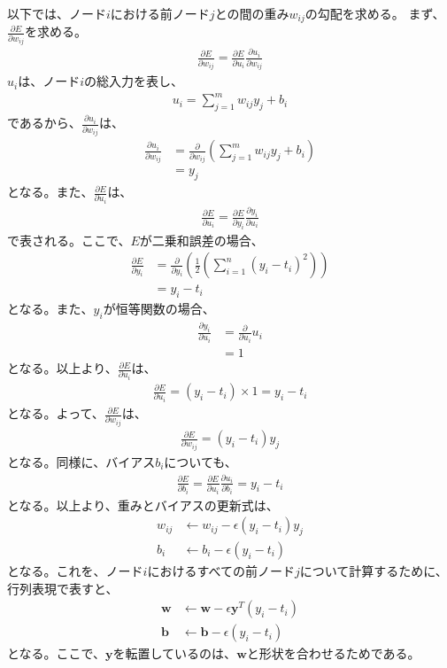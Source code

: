 \documentclass{ltjsarticle}
\begin{document}
以下では、ノード$i$における前ノード$j$との間の重み$w_{ij}$の勾配を求める。
まず、$\frac{\partial E}{\partial w_{ij}}$を求める。
\begin{align}
  \frac{\partial E}{\partial w_{ij}} = \frac{\partial E}{\partial u_i}\frac{\partial u_i}{\partial w_{ij}}
\end{align}
$u_i$は、ノード$i$の総入力を表し、
\begin{align}
  u_i = \sum_{j=1}^{m}w_{ij}y_j + b_i
\end{align}
であるから、$\frac{\partial u_i}{\partial w_{ij}}$は、
\begin{align}
  \frac{\partial u_i}{\partial w_{ij}} &= \frac{\partial}{\partial w_{ij}}\left( \sum_{j=1}^{m}w_{ij}y_j + b_i \right)\\
   &= y_j
\end{align}
となる。また、$\frac{\partial E}{\partial u_i}$は、
\begin{align}
  \frac{\partial E}{\partial u_i} = \frac{\partial E}{\partial y_i}\frac{\partial y_i}{\partial u_i}
\end{align}
で表される。ここで、$E$が二乗和誤差の場合、
\begin{align}
  \frac{\partial E}{\partial y_i} &= \frac{\partial}{\partial y_i}\left( \frac{1}{2} \left( \sum_{i=1}^{n}(y_i - t_i)^2 \right) \right) \\
  &= y_i - t_i
\end{align}
となる。また、$y_i$が恒等関数の場合、
\begin{align}
  \frac{\partial y_i}{\partial u_i} &= \frac{\partial}{\partial u_i}u_i \\
  &= 1
\end{align}
となる。以上より、$\frac{\partial E}{\partial u_i}$は、
\begin{align}
  \frac{\partial E}{\partial u_i} = (y_i - t_i) \times 1 = y_i - t_i
\end{align}
となる。よって、$\frac{\partial E}{\partial w_{ij}}$は、
\begin{align}
  \frac{\partial E}{\partial w_{ij}} = (y_i - t_i)y_j
\end{align}
となる。同様に、バイアス$b_i$についても、
\begin{align}
  \frac{\partial E}{\partial b_i} = \frac{\partial E}{\partial u_i}\frac{\partial u_i}{\partial b_i} = y_i - t_i
\end{align}
となる。以上より、重みとバイアスの更新式は、
\begin{align}
  w_{ij} &\leftarrow w_{ij} - \epsilon(y_i - t_i)y_j \\
  b_i &\leftarrow b_i - \epsilon(y_i - t_i)
\end{align}
となる。これを、ノード$i$におけるすべての前ノード$j$について計算するために、行列表現で表すと、
\begin{align}
  \mathbf{w} &\leftarrow \mathbf{w} - \epsilon \mathbf{y}^T(y_i - t_i) \\
  \mathbf{b} &\leftarrow \mathbf{b} - \epsilon(y_i - t_i)
\end{align}
となる。ここで、$\mathbf{y}$を転置しているのは、$\mathbf{w}$と形状を合わせるためである。
\end{document}
